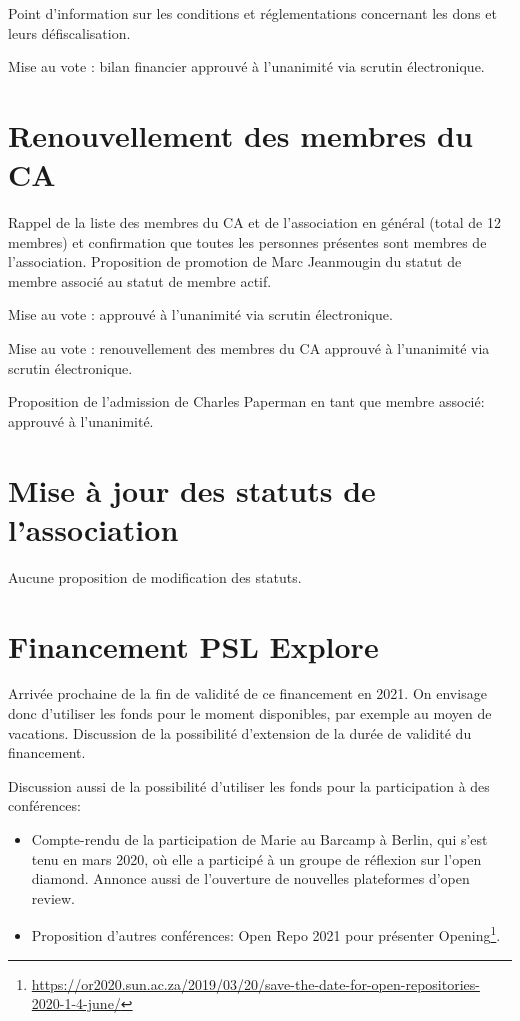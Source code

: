 \documentclass[a4paper]{article}
\begin{document}
Point d'information sur les conditions et réglementations concernant les dons et leurs défiscalisation. 

Mise au vote : bilan financier approuvé à l'unanimité via scrutin électronique.

\section{Renouvellement des membres du CA}
    Rappel de la liste des membres du CA et de l'association en général (total de 12 membres) et confirmation que toutes les personnes présentes sont membres de l'association.
    Proposition de promotion de Marc Jeanmougin du statut de membre associé au statut de membre actif.
    
    Mise au vote : approuvé à l'unanimité via scrutin électronique.
    
    Mise au vote : renouvellement des membres du CA approuvé à l'unanimité via scrutin électronique.
    
    Proposition de l'admission de Charles Paperman en tant que membre associé: approuvé à l'unanimité. 


\section{Mise à jour des statuts de l'association}
Aucune proposition de modification des statuts. 

\section{Financement PSL Explore}
Arrivée prochaine de la fin de validité de ce financement en 2021. On envisage donc d'utiliser les fonds pour le moment disponibles, par exemple au moyen de vacations. Discussion de la possibilité d'extension de la durée de validité du financement. 

Discussion aussi de la possibilité d'utiliser les fonds pour la participation à des conférences: 
\begin{itemize}
\item Compte-rendu de la participation de Marie au Barcamp à Berlin, qui s'est tenu en mars 2020, où elle a participé à un groupe de réflexion sur l'open diamond. Annonce aussi de l'ouverture de nouvelles plateformes d'open review. 
\item Proposition d'autres conférences: Open Repo 2021 pour présenter
Opening\footnote{\tiny \url{https://or2020.sun.ac.za/2019/03/20/save-the-date-for-open-repositories-2020-1-4-june/}}. \end{itemize}
\end{document}
